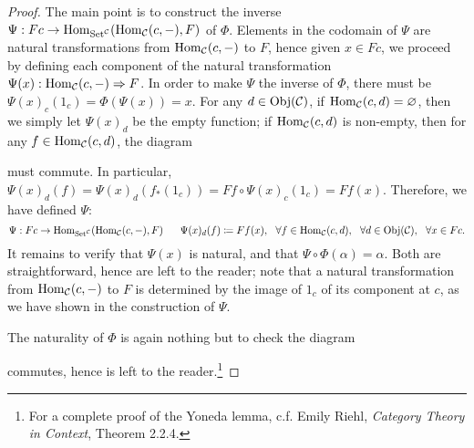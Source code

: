 	\begin{proof}
		The main point is to construct the inverse $\Psi:Fc\to\operatorname{Hom}_\mathcal{\mathrm{Set}^\mathcal{C}}(\operatorname{Hom}_\mathcal{C}(c,-),F)$ of $\Phi$. Elements in the codomain of $\Psi$ are natural transformations from $\operatorname{Hom}_\mathcal{C}(c,-)$ to $F$, hence given $x\in Fc$, we proceed by defining each component of the natural transformation $\Psi(x):\operatorname{Hom}_\mathcal{C}(c,-)\Rightarrow F$. In order to make $\Psi$ the inverse of $\Phi$, there must be $\Psi(x)_c(1_c)=\Phi(\Psi(x))=x$. For any $d\in\operatorname{Obj}(\mathcal{C})$, if $\operatorname{Hom}_\mathcal{C}(c,d)=\varnothing$, then we simply let $\Psi(x)_d$ be the empty function; if $\operatorname{Hom}_\mathcal{C}(c,d)$ is non-empty, then for any $f\in\operatorname{Hom}_\mathcal{C}(c,d)$, the diagram
		\begin{center}
			\end{center}
			must commute. In particular, $\Psi(x)_d(f)=\Psi(x)_d(f_*(1_c))=Ff\circ\Psi(x)_c(1_c)=Ff(x)$. Therefore, we have defined $\Psi$:
			\[\Psi:Fc\to\Hom_{\mathrm{Set}^\mathcal{C}}(\Hom_\mathcal{C}(c,-),F)\ \ \ \ \ \Psi(x)_d(f)\coloneqq Ff(x),\ \ \forall f\in\Hom_\mathcal{C}(c,d),\ \ \forall d\in\Obj(\mathcal{C}),\ \ \forall x\in Fc.\]
			It remains to verify that $\Psi(x)$ is natural, and that $\Psi\circ\Phi(\alpha)=\alpha$. Both are straightforward, hence are left to the reader; note that a natural transformation from $\operatorname{Hom}_\mathcal{C}(c,-)$ to $F$ is determined by the image of $1_c$ of its component at $c$, as we have shown in the construction of $\Psi$.\par
			The naturality of $\Phi$ is again nothing but to check the diagram
			\begin{center}
			\end{center}
			commutes, hence is left to the reader.\footnote{For a complete proof of the Yoneda lemma, c.f. Emily Riehl, \textsl{Category Theory in Context}, Theorem 2.2.4.}
	\end{proof}
